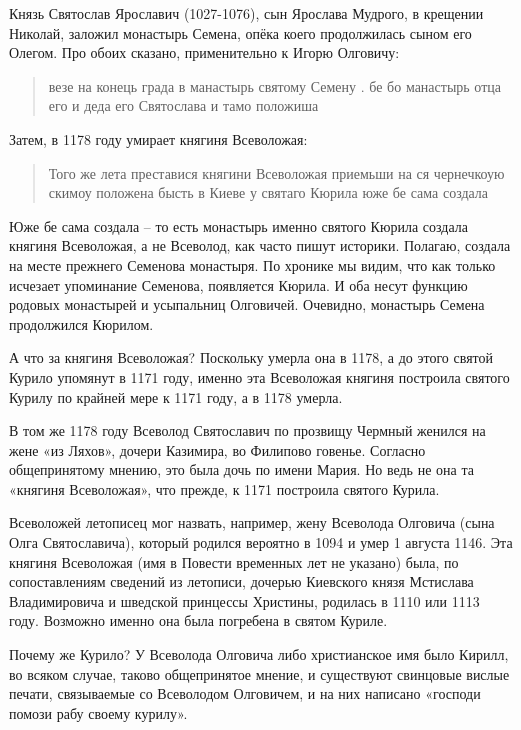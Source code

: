 \documentclass[a5paper,11pt,openany]{article}
\begin{document}
Князь Святослав Ярославич (1027-1076), сын Ярослава Мудрого, в крещении Николай, заложил монастырь Семена, опёка коего продолжилась сыном его Олегом. Про обоих сказано, применительно к Игорю Олговичу:

\begin{quotation}
\noindent везе на конець града в манастырь святому Семену . бе бо манастырь отца его и деда его Святослава и тамо положиша
\end{quotation}

Затем, в 1178 году умирает княгиня Всеволожая: 

\begin{quotation}
\noindent Того же лета преставися княгини Всеволожая приемьши на ся чернечкоую скимоу положена бысть в Киеве у святаго Кюрила юже бе сама создала
\end{quotation}

Юже бе сама создала – то есть монастырь именно святого Кюрила создала княгиня Всеволожая, а не Всеволод, как часто пишут историки. Полагаю, создала на месте прежнего Семенова монастыря. По хронике мы видим, что как только исчезает упоминание Семенова, появляется Кюрила. И оба несут функцию родовых монастырей и усыпальниц Олговичей. Очевидно, монастырь Семена продолжился Кюрилом.

А что за княгиня Всеволожая? Поскольку умерла она в 1178, а до этого святой Курило упомянут в 1171 году, именно эта Всеволожая княгиня построила святого Курилу по крайней мере к 1171 году, а в 1178 умерла.

В том же 1178 году Всеволод Святославич по прозвищу Чермный женился на жене «из Ляхов», дочери Казимира, во Филипово говенье. Согласно общепринятому мнению, это была дочь по имени Мария. Но ведь не она та «княгиня Всеволожая», что прежде, к 1171 построила святого Курила.

Всеволожей летописец мог назвать, например, жену Всеволода Олговича (сына Олга Святославича), который родился вероятно в 1094 и умер 1 августа 1146. Эта княгиня Всеволожая (имя в Повести временных лет не указано) была, по сопоставлениям сведений из летописи, дочерью Киевского князя Мстислава Владимировича и шведской принцессы Христины, родилась в 1110 или 1113 году. Возможно именно она была погребена в святом Куриле.

Почему же Курило? У Всеволода Олговича либо христианское имя было Кирилл, во всяком случае, таково общепринятое мнение, и существуют свинцовые вислые печати, связываемые со Всеволодом Олговичем, и на них написано «господи помози рабу своему курилу».
\end{document}
